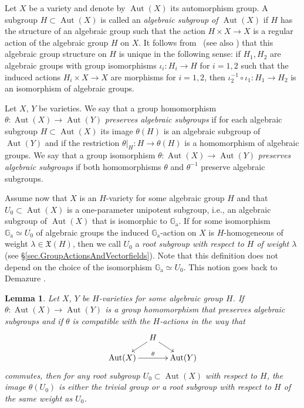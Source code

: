 \documentclass[11pt]{article}
\newcommand{\ie}{i.e.,\xspace}
\numberwithin{equation}{section}
\newcommand{\ra}{\mathrm{a}}
\theoremstyle{plain}
\newtheorem{lemma}[theorem]{Lemma}
\theoremstyle{definition}
\DeclareMathOperator{\Aut}{Aut}
\newcommand{\GG}{\mathbb{G}}
\newcommand{\name}[1]{#1}
\begin{document}
Let $X$ be a variety and denote by $\Aut(X)$ its automorphism group.
A subgroup $H \subset \Aut(X)$ is called an \emph{algebraic subgroup of $\Aut(X)$} if
$H$ has the structure of an algebraic group such that the
action $H \times X \to X$ is a regular action of the algebraic group $H$ on $X$. It follows from~\cite{Ra1964A-note-on-automorp} (see also \cite[Th.\,2.9]{KrReSa2018Is-the-affine-spac})
that this algebraic group structure on $H$ is unique in the following sense: if $H_1, H_2$ are algebraic
groups with group isomorphisms $\iota_i \colon H_i \to H$ for $i=1, 2$ such that
the induced actions $H_i \times X \to X$ are morphisms for $i=1, 2$, then
$\iota_2^{-1} \circ \iota_1 \colon H_1 \to H_2$ is an isomorphism of algebraic groups.

Let $X$, $Y$ be varieties.
We say that a group homomorphism $\theta \colon \Aut(X) \to \Aut(Y)$ \emph{preserves algebraic subgroups} if
for each algebraic subgroup $H \subset \Aut(X)$ its image $\theta(H)$ is an algebraic subgroup of $\Aut(Y)$
and if the restriction $\theta|_{H} \colon H \to \theta(H)$ is a homomorphism of algebraic groups.
We say that a group isomorphism $\theta \colon \Aut(X) \to \Aut(Y)$
\emph{preserves algebraic subgroups} if both
homomorphisms $\theta$ and $\theta^{-1}$ preserve algebraic subgroups.

Assume now that $X$ is an $H$-variety for some algebraic group $H$ and that
$U_0 \subset \Aut(X)$ is
a one-parameter unipotent subgroup, \ie an algebraic subgroup of $\Aut(X)$ that
is isomorphic to $\GG_\ra$. If for some isomorphism $\GG_\ra \simeq U_0$
of algebraic groups the induced $\GG_\ra$-action on $X$ is
$H$-homogeneous of weight $\lambda \in \mathfrak{X}(H)$, then we call
$U_0$ a \emph{root subgroup with respect to $H$
of weight $\lambda$} (see \S\ref{sec.GroupActionsAndVectorfields}). Note that this
definition does not depend on the choice of the isomorphism $\GG_\ra \simeq U_0$. This notion goes back
to \name{Demazure} \cite{De1970Sous-groupes-algeb}.

\begin{lemma}
\label{lem.auto_perserves_weights}
Let $X$, $Y$ be $H$-varieties for some algebraic group $H$.
If $\theta \colon \Aut(X) \to \Aut(Y)$ is a group homomorphism that
preserves algebraic subgroups and if $\theta$ is compatible with the $H$-actions
in the way that
\[
\xymatrix@=10pt{
& H \ar[ld] \ar[rd] & \\
\Aut(X) \ar[rr]^-{\theta} && \Aut(Y)
}
\]
commutes, then for any root subgroup $U_0 \subset \Aut(X)$ with respect to
$H$, the image $\theta(U_0)$ is either the trivial group or
a root subgroup with respect to $H$ of the same weight as $U_0$.
\end{lemma}
\end{document}
